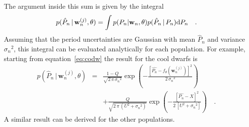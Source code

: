 \documentclass[useAMS, usenatbib]{mn2e}
\newcommand{\w}{\mathbf{w}}
\begin{document}
The argument inside this sum is given by the integral
\begin{equation}
p(\hat{P}_n\,|\,\mathbf{w}_n^{(j)},\theta) =
    \int p(P_n|\w_n,\theta) p(\hat{P}_n\,|\,P_n) {\rm d}P_n \quad.
\end{equation}
Assuming that the period uncertainties are Gaussian with mean $\hat{P}_n$
and variance ${\sigma_n}^2$, this integral can be evaluated analytically for
each population.
For example, starting from equation~\ref{eq:codw} the result for the cool
dwarfs is
\begin{eqnarray}
p(\hat{P}_n\,|\,\mathbf{w}_n^{(j)},\theta) &=&
    \frac{1-Q}{\sqrt{2\,\pi\,{\sigma_n}^2}} \exp\left( -
        \frac{\left[\hat{P_n} - f_\theta (\w_n^{(j)}) \right] ^2}
             {2\,{\sigma_n}^2}\right) \nonumber\\
    && +
    \frac{Q}{\sqrt{2\,\pi\,(U^2 + {\sigma_n}^2)}} \exp\left( -
        \frac{[\hat{P_n} - X] ^2}{2\,[U^2 + {\sigma_n}^2]}\right) \quad.
\end{eqnarray}
A similar result can be derived for the other populations.
\end{document}
